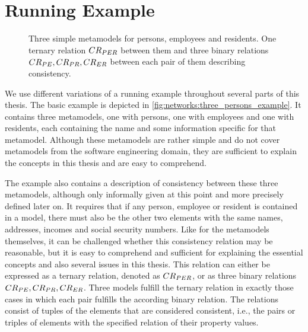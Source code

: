 


\section{Running Example}
\label{chap:networks:example}


\begin{figure}
    \centering
    
    \caption[Three metamodels with exemplary consistency relations]{Three simple metamodels for persons, employees and residents. One ternary relation $\consistencyrelation{CR}{PER}$ between them and three binary relations $\consistencyrelation{CR}{PE}, \consistencyrelation{CR}{PR}, \consistencyrelation{CR}{ER}$ between each pair of them describing consistency.}
    \label{fig:networks:three_persons_example}
\end{figure}

We use different variations of a running example throughout several parts of this thesis.
The basic example is depicted in \autoref{fig:networks:three_persons_example}.
It contains three metamodels, one with persons, one with employees and one with residents, each containing the name and some information specific for that metamodel.
Although these metamodels are rather simple and do not cover metamodels from the software engineering domain, they are sufficient to explain the concepts in this thesis and are easy to comprehend.

The example also contains a description of consistency between these three metamodels, although only informally given at this point and more precisely defined later on.
It requires that if any person, employee or resident is contained in a model, there must also be the other two elements with the same names, addresses, incomes and social security numbers.
Like for the metamodels themselves, it can be challenged whether this consistency relation may be reasonable, but it is easy to comprehend and sufficient for explaining the essential concepts and also several issues in this thesis.
This relation can either be expressed as a ternary relation, denoted as $\consistencyrelation{CR}{PER}$, or as three binary relations $\consistencyrelation{CR}{PE}, \consistencyrelation{CR}{PR}, \consistencyrelation{CR}{ER}$.
Three models fulfill the ternary relation in exactly those cases in which each pair fulfills the according binary relation.
The relations consist of tuples of the elements that are considered consistent, i.e., the pairs or triples of elements with the specified relation of their property values.

